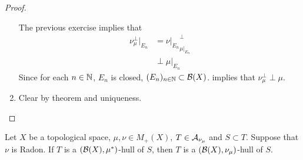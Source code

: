 \documentclass{book}
\begin{document}
\begin{proof}
\begin{enumerate}
			The previous exercise implies that 
			\begin{align*}
				\nu_{\mu}^{\perp}|_{E_n} 
				& = {\nu|_{E_n}}_{\mu|_{E_n}}^{\perp} \\
				& \perp \mu|_{E_n}
			\end{align*}
			Since for each $n \in \mathbb{N}$, $E_n$ is closed, $(E_n)_{n \in \mathbb{N}} \subset \mathcal{B}(X)$.  implies that $\nu_{\mu}^{\perp} \perp \mu$.
			\item Clear by theorem and uniqueness. \\
		\end{enumerate}
	\end{proof}



	\begin{ex} 
		Let $X$ be a topological space, $\mu, \nu \in M_+(X)$, $T \in \mathcal{A}_{\nu_{\mu}}$ and $S \subset T$. Suppose that $\nu$ is Radon. If $T$ is a $(\mathcal{B}(X), \mu^*)$-hull of $S$, then $T$ is a $(\mathcal{B}(X), \nu_{\mu})$-hull of $S$.
	\end{ex}
\end{document}
